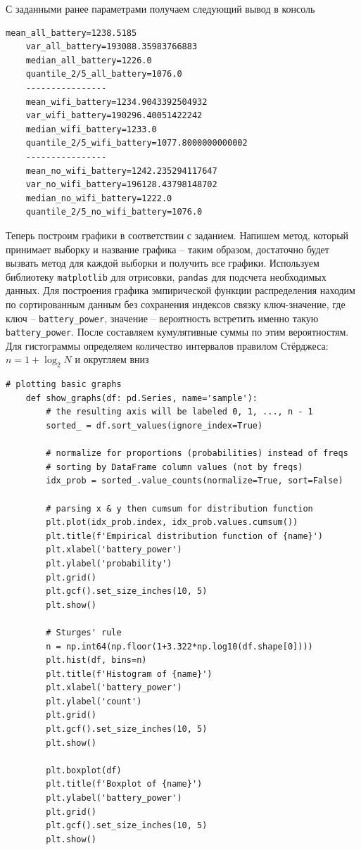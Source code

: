 \documentclass[a4paper, 12pt]{article}
\begin{document}
    С заданными ранее параметрами получаем следующий вывод в консоль
    \begin{lstlisting}[label=mvalsout, caption={Вывод в консоль: посчитанные основные характеристики}]
    mean_all_battery=1238.5185
    var_all_battery=193088.35983766883  
    median_all_battery=1226.0
    quantile_2/5_all_battery=1076.0     
    ----------------
    mean_wifi_battery=1234.9043392504932
    var_wifi_battery=190296.40051422242 
    median_wifi_battery=1233.0
    quantile_2/5_wifi_battery=1077.8000000000002
    ----------------
    mean_no_wifi_battery=1242.235294117647      
    var_no_wifi_battery=196128.43798148702      
    median_no_wifi_battery=1222.0
    quantile_2/5_no_wifi_battery=1076.0
    \end{lstlisting}


    Теперь построим графики в соответствии с заданием.
    Напишем метод, который принимает выборку и название графика -- таким образом, достаточно
    будет вызвать метод для каждой выборки и получить все графики. Используем библиотеку 
    \texttt{matplotlib} для отрисовки, \texttt{pandas} для подсчета необходимых данных.
    Для построения графика эмпирической функции распределения находим
    по сортированным данным без сохранения индексов связку ключ-значение, где ключ --
    \texttt{battery\_{power}}, значение -- вероятность встретить именно такую \texttt{battery\_{power}}.
    После составляем кумулятивные суммы по этим вероятностям. Для гистограммы определяем
    количество интервалов правилом Стёрджеса: $n=1+\log_2{N}$ и округляем вниз
    \begin{lstlisting}[label=graps, caption={Код для построения необходимых графиков}]
    # plotting basic graphs
    def show_graphs(df: pd.Series, name='sample'):
        # the resulting axis will be labeled 0, 1, ..., n - 1
        sorted_ = df.sort_values(ignore_index=True)

        # normalize for proportions (probabilities) instead of freqs
        # sorting by DataFrame column values (not by freqs)
        idx_prob = sorted_.value_counts(normalize=True, sort=False)

        # parsing x & y then cumsum for distribution function
        plt.plot(idx_prob.index, idx_prob.values.cumsum())
        plt.title(f'Empirical distribution function of {name}')
        plt.xlabel('battery_power')
        plt.ylabel('probability')
        plt.grid()
        plt.gcf().set_size_inches(10, 5)
        plt.show()

        # Sturges' rule
        n = np.int64(np.floor(1+3.322*np.log10(df.shape[0])))
        plt.hist(df, bins=n)
        plt.title(f'Histogram of {name}')
        plt.xlabel('battery_power')
        plt.ylabel('count')
        plt.grid()
        plt.gcf().set_size_inches(10, 5)
        plt.show()

        plt.boxplot(df)
        plt.title(f'Boxplot of {name}')
        plt.ylabel('battery_power')
        plt.grid()
        plt.gcf().set_size_inches(10, 5)
        plt.show()
    \end{lstlisting}
\end{document}
